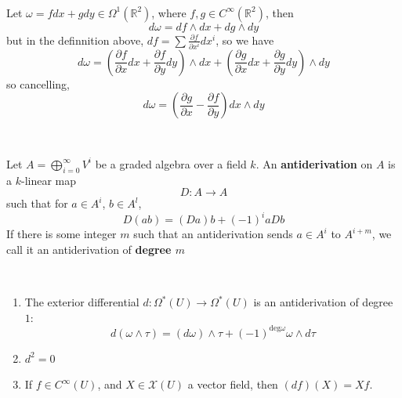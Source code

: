\documentclass{article}
\begin{document}
\begin{example}
  \

  Let $\omega = fdx + gdy \in \Omega^1(\mathbb{R}^2)$, where $f,g \in C^\infty(\mathbb{R}^2)$, then $$d\omega = df \wedge dx + dg \wedge dy $$but in the definnition above, $df = \sum \frac{\partial f}{\partial x^i} dx^i$, so we have $$d\omega = (\frac{\partial f}{\partial x} dx + \frac{\partial f}{\partial y} dy) \wedge dx +(\frac{\partial g}{\partial x} dx + \frac{\partial g}{\partial y} dy) \wedge dy$$so cancelling, $$d\omega = (\frac{\partial g}{\partial x} - \frac{\partial f}{\partial y}) dx \wedge dy$$
\end{example}

\begin{definition}[Antiderivation]
  \

  Let $A = \bigoplus_{i=0}^\infty V^i$ be a graded algebra over a field $k$. An \textbf{antiderivation} on $A$ is a $k$-linear map $$D: A \to A$$such that for $a \in A^i$, $b \in A^l$, $$D(ab) = (Da)b + (-1)^iaDb$$If there is some integer $m$ such that an antiderivation sends $a \in A^i$ to $A^{i+m}$, we call it an antiderivation of \textbf{degree $m$}
\end{definition}

\begin{proposition}
  \

  \begin{enumerate}
    \item The exterior differential $d: \Omega^*(U) \to \Omega^*(U)$ is an antiderivation of degree $1$: $$d(\omega \wedge \tau) = (d\omega) \wedge \tau + (-1)^{\text{deg} \omega} \omega \wedge d\tau$$
    \item $d^2 = 0$
    \item If $f \in C^\infty(U)$, and $X \in \mathcal{X}(U)$ a vector field, then $(df)(X) = Xf$.
  \end{enumerate}
\end{proposition}
\end{document}
